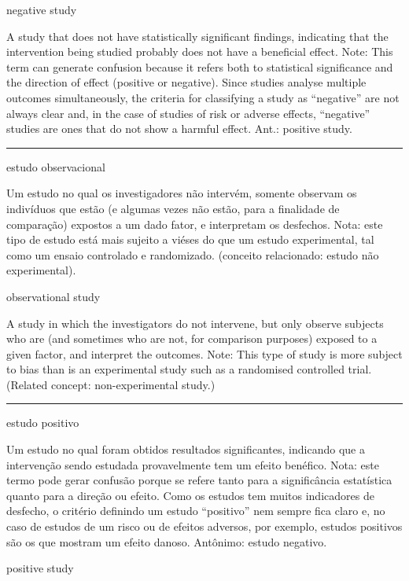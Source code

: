 \documentclass[
  openany]{book}
\begin{document}
negative study

A study that does not have statistically significant findings, indicating that the intervention being studied probably does not have a beneficial effect. Note: This term can generate confusion because it refers both to statistical significance and the direction of effect (positive or negative). Since studies analyse multiple outcomes simultaneously, the criteria for classifying a study as ``negative'' are not always clear and, in the case of studies of risk or adverse effects, ``negative'' studies are ones that do not show a harmful effect. Ant.: positive study.

\begin{center}\rule{0.5\linewidth}{0.5pt}\end{center}

estudo observacional

Um estudo no qual os investigadores não intervém, somente observam os indivíduos que estão (e algumas vezes não estão, para a finalidade de comparação) expostos a um dado fator, e interpretam os desfechos. Nota: este tipo de estudo está mais sujeito a viéses do que um estudo experimental, tal como um ensaio controlado e randomizado. (conceito relacionado: estudo não experimental).

observational study

A study in which the investigators do not intervene, but only observe subjects who are (and sometimes who are not, for comparison purposes) exposed to a given factor, and interpret the outcomes. Note: This type of study is more subject to bias than is an experimental study such as a randomised controlled trial. (Related concept: non-experimental study.)

\begin{center}\rule{0.5\linewidth}{0.5pt}\end{center}

estudo positivo

Um estudo no qual foram obtidos resultados significantes, indicando que a intervenção sendo estudada provavelmente tem um efeito benéfico. Nota: este termo pode gerar confusão porque se refere tanto para a significância estatística quanto para a direção ou efeito. Como os estudos tem muitos indicadores de desfecho, o critério definindo um estudo ``positivo'' nem sempre fica claro e, no caso de estudos de um risco ou de efeitos adversos, por exemplo, estudos positivos são os que mostram um efeito danoso. Antônimo: estudo negativo.

positive study
\end{document}
